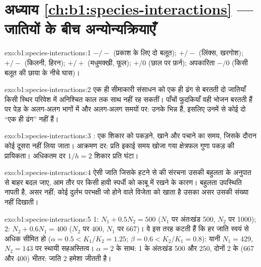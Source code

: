 \section*{अध्याय \ref{ch:b1:species-interactions} --- जातियों के बीच अन्योन्यक्रियाएँ}

\begin{solution}{exo:b1:species-interactions:1}
 $-/-$ (प्रकाश के लिए दो बलूत);  $+/-$ (लिंक्स, खरगोश);
 $+/-$ (किलनी, हिरन);  $+/+$ (मधुमक्खी, फूल);
 $+/0$ (छाल पर फ़र्न); अपकारिता $-/0$ (किसी बलूत की छाया के नीचे
घास)।
\end{solution}

\begin{solution}{exo:b1:species-interactions:2}
एक ही सीमाकारी संसाधन को एक ही ढंग से बरतती दो जातियाँ किसी स्थिर
परिवेश में अनिश्चित काल तक साथ नहीं रह सकतीं। पाँचों फुदकियाँ
वही भोजन बरतती हैं पर पेड़ के अलग-अलग भागों में और अलग-अलग
समयों पर: उनके  भिन्न हैं, इसलिए उनमें से कोई दो ``एक ही ढंग'' नहीं हैं।
\end{solution}

\begin{solution}{exo:b1:species-interactions:3}
: एक शिकार को पकड़ने, खाने और पचाने का समय, जिसके
दौरान कोई दूसरा नहीं लिया जाता। आक्रमण दर: प्रति इकाई समय खोजा गया
क्षेत्रफल गुणा पकड़ की प्रायिकता। अधिकतम दर $1/h = 2$ शिकार प्रति
घंटा।
\end{solution}

\begin{solution}{exo:b1:species-interactions:4}
ऐसी जाति जिसके हटने से  की संरचना उसकी बहुलता के अनुपात से बाहर
बदल जाए, आम तौर पर किसी हावी स्पर्धी को काबू में रखने के कारण।
बहुलता उपस्थिति नापती है, असर नहीं; कोई दुर्लभ परभक्षी
जो होने वाले विजेता को खाता है उसका असर उसकी संख्या नहीं दिखाती।
\end{solution}

\begin{solution}{exo:b1:species-interactions:5}
 1: $N_1 + 0.5 N_2 = 500$ ($N_1$ पर अंतःखंड 500, $N_2$ पर
1000);  2: $N_2 + 0.6 N_1 = 400$ ($N_2$ पर 400, $N_1$ पर 667)।
वे इस तरह कटती हैं कि हर जाति स्वयं से अधिक सीमित हो ($\alpha = 0.5 <
K_1/K_2 = 1.25$; $\beta = 0.6 < K_2/K_1 = 0.8$): यानी
$N_1 = 429$, $N_2 = 143$ पर स्थायी सहअस्तित्व। $\alpha = 2$ के साथ:
 1 के अंतःखंड 500 और 250, दोनों  2 के (667 और 400) भीतर:
जाति 2 हमेशा जीतती है।
\end{solution}

